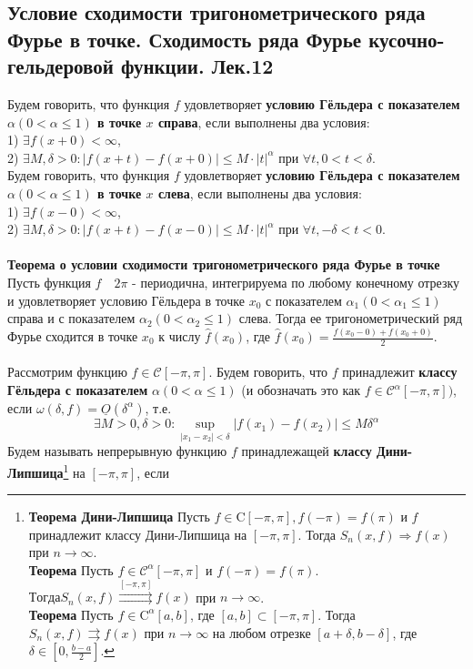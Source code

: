 \documentclass{article}
\begin{document}
\subsection{Условие сходимости тригонометрического ряда Фурье в точке. Сходимость ряда Фурье кусочно-гельдеровой функции. Лек.12}
	Будем говорить, что функция $ f $ удовлетворяет \textbf{условию Гёльдера с показателем $ \alpha(0<\alpha \leqslant 1) $ в точке $ x $ справа}, если выполнены два условия:\\
	1) $\exists f(x+0)<\infty$,\\
	2) $\exists M, \delta>0:|f(x+t)-f(x+0)| \leqslant M \cdot|t|^{\alpha}$ при $ \forall t, 0<t<\delta$.\\ 
	Будем говорить, что функция $ f $ удовлетворяет \textbf{условию Гёльдера с показателем $ \alpha(0<\alpha \leqslant 1) $ в точке $ x $ слева}, если выполнены два условия:\\
	1) $ \exists f(x-0)<\infty$,\\ 
	2) $ \exists M, \delta>0:|f(x+t)-f(x-0)| \leqslant M \cdot|t|^{\alpha} $ при $ \forall t,-\delta<t<0$.\\
	\\
	\textbf{Теорема о условии сходимости тригонометрического ряда Фурье в точке} Пусть функция $ f \quad 2\pi$ - периодична, интегрируема по любому конечному отрезку и удовлетворяет условию Гёльдера в точке ${x}_{0}$ с показателем $ \alpha_{1}   \left(0<\alpha_{1} \leqslant 1\right) $ справа и с показателем $ \alpha_{2}\left(0<\alpha_{2} \leqslant 1\right) $ слева. Тогда ее тригонометрический ряд Фурье сходится в точке ${x}_{0}$ к числу $ \hat{f}\left(x_{0}\right)$, где $\hat{f}\left(x_{0}\right)=\frac{f\left(x_{0}-0\right)+f\left(x_{0}+0\right)}{2}$.\\  
	\\
	Рассмотрим функцию $ f \in \mathcal{C}[-\pi, \pi]$.	Будем говорить, что $ f $ принадлежит \textbf{классу Гёльдера с показателем} $ \alpha   (0<\alpha \leqslant 1)$ (и обозначать это как $ f \in \mathcal{C}^{\alpha}[-\pi, \pi])$,  если $ \omega(\delta, f)=\underline{O}(\delta^{\alpha})$, т.е.
	\begin{equation}
	\exists M>0, \delta>0: \sup _{\left|x_{1}-x_{2}\right|<\delta}\left|f\left(x_{1}\right)-f\left(x_{2}\right)\right| \leqslant M \delta^{\alpha}
	\end{equation}
	Будем называть непрерывную функцию $f$ принадлежащей \textbf{классу Дини-Липшица}\footnote{\textbf{Теорема Дини-Липшица} Пусть $ f \in \mathrm{C}[-\pi, \pi], f(-\pi)=f(\pi) $ и $ f $ принадлежит классу Дини-Липшица на $ [-\pi, \pi] $. Тогда $ S_{n}(x, f) \Rightarrow f(x) $ при $ n \rightarrow \infty$.\\
	\textbf{Теорема} Пусть $ f \in \mathcal{C}^{\alpha}[-\pi, \pi] $ и $ f(-\pi)=f(\pi)$. $ Тогда  S_{n}(x, f) \stackrel{[-\pi, \pi]}{\rightrightarrows} f(x) $ при $ n \rightarrow \infty $.\\
	\textbf{Теорема} Пусть $ f \in{\mathrm{C}}^{\alpha}[a, b]$, где $ [a, b] \subset[-\pi, \pi]$. Тогда $ S_{n}(x, f) \rightrightarrows f(x) $ при $ n \rightarrow \infty $	на любом отрезке $ [a+\delta, b-\delta]$,  где $ \delta \in\left[0, \frac{b-a}{2}\right]$.} на $[-\pi,\pi]$, если
\end{document}
